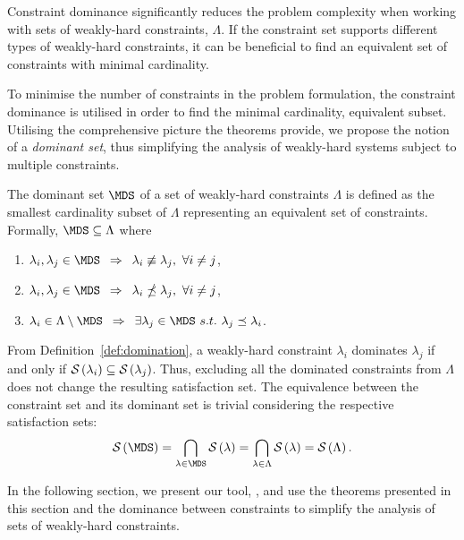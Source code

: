 Constraint dominance significantly reduces the problem complexity when working with sets of weakly-hard constraints, $\Lambda$. 
If the constraint set supports different types of weakly-hard constraints, it can be beneficial to find an equivalent set of constraints with minimal cardinality.

To minimise the number of constraints in the problem formulation, the constraint dominance is utilised in order to find the minimal cardinality, equivalent subset.
Utilising the comprehensive picture the theorems provide, we propose the notion of a \emph{dominant set}, thus simplifying the analysis of weakly-hard systems subject to multiple constraints.
%
\begin{definition}%
    \label{def:dominant-set}%
    The dominant set $\MDS$ of a set of weakly-hard constraints $\Lambda$ is defined as the smallest cardinality subset of $\Lambda$ representing an equivalent set of constraints.
    Formally, $\MDS \subseteq \Lambda$ where
    \begin{enumerate}[label=(\roman*)]
        \item $\lambda_i, \lambda_j \in \MDS \,\,\, \Rightarrow \,\,\, \lambda_i \nequiv \lambda_j,\,\, \forall i \neq j$,
        \item $\lambda_i, \lambda_j \in \MDS \,\,\, \Rightarrow \,\,\, \lambda_i \npreceq \lambda_j,\,\, \forall i \neq j$,
        \item $\lambda_i \in \Lambda \setminus \MDS \,\,\, \Rightarrow \,\,\, \exists \lambda_j \in \MDS\,\,s.t.\,\,\lambda_j \preceq \lambda_i$.
    \end{enumerate}
\end{definition}
%
From Definition~\ref{def:domination}, a weakly-hard constraint $\lambda_i$ dominates $\lambda_j$ if and only if $\mathcal{S}_{}\left( \lambda_i \right) \subseteq \mathcal{S}_{}\left( \lambda_j \right)$.
Thus, excluding all the dominated constraints from $\Lambda$ does not change the resulting satisfaction set.
The equivalence between the constraint set and its dominant set is trivial considering the respective satisfaction sets:
%
\begin{equation*}
    \sset{}{\MDS} = \bigcap_{\lambda \in \MDS} \sset{}{\lambda} = \bigcap_{\lambda \in \Lambda} \sset{}{\lambda} = \sset{}{\Lambda}.
\end{equation*}

In the following section, we present our tool, \tool{}, and use the theorems presented in this section and the dominance between constraints to simplify the analysis of sets of weakly-hard constraints.
